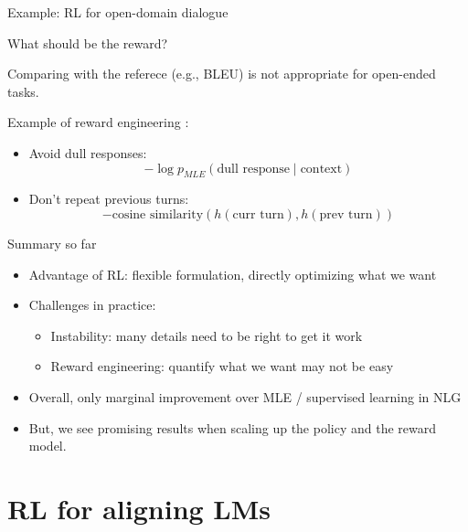 \documentclass[usenames,dvipsnames,notes,11pt,aspectratio=169,hyperref={colorlinks=true, linkcolor=blue}]{beamer}
\begin{document}
\begin{frame}
    {Example: RL for open-domain dialogue}

    What should be the reward?

    Comparing with the referece (e.g., BLEU) is not appropriate for open-ended tasks.

    \pause
    Example of reward engineering :
    \begin{itemize}
        \item Avoid dull responses:
            $$
            -\log p_{MLE}(\text{dull response} \mid \text{context})
            $$
        \item Don't repeat previous turns:
            $$
            -\text{cosine similarity}(h(\text{curr turn}), h(\text{prev turn}))
            $$
    \end{itemize}
\end{frame}

\begin{frame}
    {Summary so far}
    \begin{itemize}
        \itemsep1em
        \item Advantage of RL: flexible formulation, directly optimizing what we want
        \item Challenges in practice:
            \begin{itemize}
                \item Instability: many details need to be right to get it work
                \item Reward engineering: quantify what we want may not be easy
            \end{itemize}
        \item Overall, only marginal improvement over MLE / supervised learning in NLG
        \item But, we see promising results when scaling up the policy and the reward model. 
    \end{itemize}
\end{frame}

\section{RL for aligning LMs}
\end{document}
